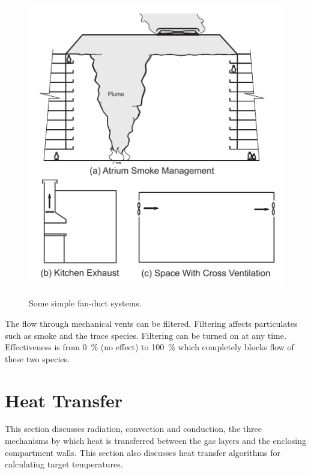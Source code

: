\begin{figure}
\begin{center}
\includegraphics[width=5.0in]{FIGURES/Theory/HVAC_Fans_and_Ducts}\\
\end{center}
\caption{Some simple fan-duct systems.}
 \label{fig:Fans_and_Ducts}
\end{figure}

The flow through mechanical vents can be filtered. Filtering affects particulates such as smoke and the trace species. Filtering can be turned on at any time. Effectiveness is from 0~\% (no effect) to 100~\% which completely blocks flow of these two species.





\chapter{Heat Transfer}

This section discusses radiation, convection and conduction, the three mechanisms by which heat is transferred between the gas layers and the enclosing compartment walls.  This section also discusses heat transfer algorithms for calculating target temperatures.

